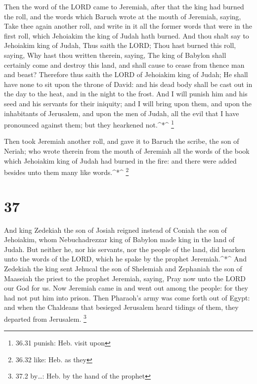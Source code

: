  Then the word of the LORD came to Jeremiah, after that the
king had burned the roll, and the words which Baruch wrote at the mouth
of Jeremiah, saying,  Take thee again another roll, and
write in it all the former words that were in the first roll, which
Jehoiakim the king of Judah hath burned.  And thou shalt
say to Jehoiakim king of Judah, Thus saith the LORD; Thou hast burned
this roll, saying, Why hast thou written therein, saying, The king of
Babylon shall certainly come and destroy this land, and shall cause to
cease from thence man and beast?  Therefore thus saith the
LORD of Jehoiakim king of Judah; He shall have none to sit upon the
throne of David: and his dead body shall be cast out in the day to the
heat, and in the night to the frost.  And I will punish him
and his seed and his servants for their iniquity; and I will bring upon
them, and upon the inhabitants of Jerusalem, and upon the men of Judah,
all the evil that I have pronounced against them; but they hearkened
not.\^{}*\^{} \footnote{36.31 punish: Heb. visit upon}

 Then took Jeremiah another roll, and gave it to Baruch the
scribe, the son of Neriah; who wrote therein from the mouth of Jeremiah
all the words of the book which Jehoiakim king of Judah had burned in
the fire: and there were added besides unto them many like
words.\^{}*\^{} \footnote{36.32 like: Heb. as they}

\hypertarget{section-36}{%
\section{37}\label{section-36}}

 And king Zedekiah the son of Josiah reigned instead of
Coniah the son of Jehoiakim, whom Nebuchadrezzar king of Babylon made
king in the land of Judah.  But neither he, nor his
servants, nor the people of the land, did hearken unto the words of the
LORD, which he spake by the prophet Jeremiah.\^{}*\^{}  And
Zedekiah the king sent Jehucal the son of Shelemiah and Zephaniah the
son of Maaseiah the priest to the prophet Jeremiah, saying, Pray now
unto the LORD our God for us.  Now Jeremiah came in and went
out among the people: for they had not put him into prison. 
Then Pharaoh's army was come forth out of Egypt: and when the Chaldeans
that besieged Jerusalem heard tidings of them, they departed from
Jerusalem. \footnote{37.2 by\ldots: Heb. by the hand of the prophet}

